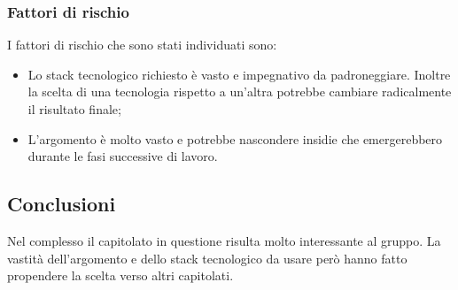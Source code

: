 \documentclass[../StudioDiFattibilita.tex]{subfiles}
\begin{document}
			\subsubsection{Fattori di rischio}
			I fattori di rischio che sono stati individuati sono:
			\begin{itemize}
				\item Lo stack tecnologico richiesto è vasto e impegnativo da padroneggiare. Inoltre la scelta di una tecnologia rispetto a un'altra potrebbe cambiare radicalmente il risultato finale;
				\item L'argomento è molto vasto e potrebbe nascondere insidie che emergerebbero durante le fasi successive di lavoro.
			\end{itemize}
			\subsection{Conclusioni}
				Nel complesso il capitolato in questione risulta molto interessante al gruppo. La vastità dell'argomento e dello stack tecnologico da usare però hanno fatto propendere la scelta verso altri capitolati.
\end{document}
